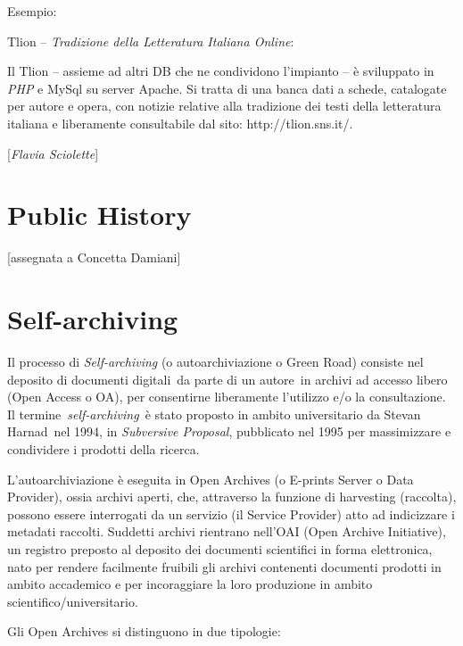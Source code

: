 Esempio:

Tlion -- \emph{Tradizione della Letteratura Italiana Online}:

Il Tlion -- assieme ad altri DB che ne condividono l'impianto -- è
sviluppato in \emph{PHP} e MySql su server Apache. Si tratta di una
banca dati a schede, catalogate per autore e opera, con notizie relative
alla tradizione dei testi della letteratura italiana e liberamente
consultabile dal sito: http://tlion.sns.it/.

\hrulefill 
 
{[}\emph{Flavia Sciolette}{]}



\chapter{Public History}

{[}assegnata a Concetta Damiani{]}



\chapter{Self-archiving}

Il processo di \emph{Self-archiving} (o autoarchiviazione o Green Road)
consiste nel deposito di documenti digitali~da parte di un autore~in
archivi ad accesso libero (Open Access o OA), per consentirne
liberamente l'utilizzo e/o la consultazione. Il
termine~\emph{self-archiving}~è stato proposto in ambito universitario
da Stevan Harnad~nel 1994, in \emph{Subversive Proposal}, pubblicato nel
1995 per massimizzare e condividere i prodotti della ricerca.

L'autoarchiviazione è eseguita in Open Archives (o E-prints Server o
Data Provider), ossia archivi aperti, che, attraverso la funzione di
harvesting (raccolta), possono essere interrogati da un servizio (il
Service Provider) atto ad indicizzare i metadati raccolti. Suddetti
archivi rientrano nell'OAI (Open Archive Initiative), un registro
preposto al deposito dei documenti scientifici in forma elettronica,
nato per rendere facilmente fruibili gli archivi contenenti documenti
prodotti in ambito accademico e per incoraggiare la loro produzione in
ambito scientifico/universitario.

Gli Open Archives si distinguono in due tipologie:

